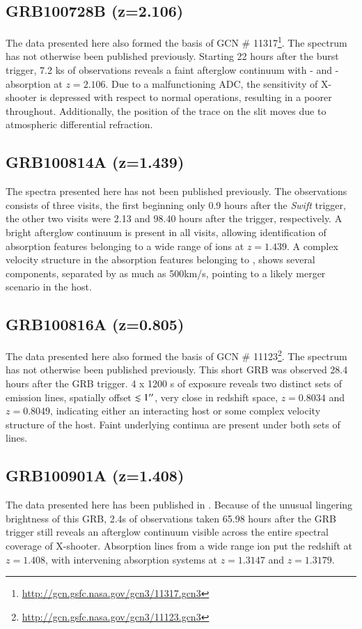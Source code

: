 \documentclass{aa}    %
\begin{document}
\subsection{GRB100728B (z=2.106)}
The data presented here also formed the basis of GCN \#
11317\footnote{\url{http://gcn.gsfc.nasa.gov/gcn3/11317.gcn3}}. The spectrum
has not otherwise been published previously. Starting 22 hours after the burst
trigger, 7.2 ks of observations reveals a faint afterglow continuum with \lya-
and \mgii-absorption at $z=2.106$. Due to a malfunctioning ADC, the sensitivity
of X-shooter is depressed with respect to normal operations, resulting in a
poorer throughout. Additionally, the position of the trace on the slit moves
due to atmospheric differential refraction.

\subsection{GRB100814A (z=1.439)}
The spectra presented here has not been published previously. The
observations consists of three visits, the first beginning only 0.9 hours
after the \textit{Swift} trigger, the other two visits were 2.13 and 98.40
hours after the trigger, respectively. A bright afterglow continuum is
present in all visits, allowing identification of absorption features
belonging to a wide range of ions at $z=1.439$. A complex velocity structure
in the absorption features belonging to \mgii, shows several components,
separated by as much as 500km/s, pointing to a likely merger scenario in
the host.

\subsection{GRB100816A (z=0.805)}
The data presented here also formed the basis of GCN \#
11123\footnote{\url{http://gcn.gsfc.nasa.gov/gcn3/11123.gcn3}}. The spectrum
has not otherwise been published previously. This short GRB was observed 28.4
hours after the GRB trigger. 4 x 1200 s of exposure reveals two distinct sets
of emission lines, spatially offset $\lesssim 1 ^{\prime\prime} $, very close in
redshift space, $z=0.8034$ and $z=0.8049$, indicating either an interacting
host or some complex velocity structure of the host. Faint underlying continua
are present under both sets of lines.

\subsection{GRB100901A (z=1.408)}
The data presented here has been published in \citet{Hartoog2013}. Because of
the unusual lingering brightness of this GRB, 2.4s of observations taken 65.98
hours after the GRB trigger still reveals an afterglow continuum visible across
the entire spectral coverage of X-shooter. Absorption lines from a wide range
ion put the redshift at $z=1.408$, with intervening absorption systems at $z =
1.3147$ and $z = 1.3179$.
\end{document}
